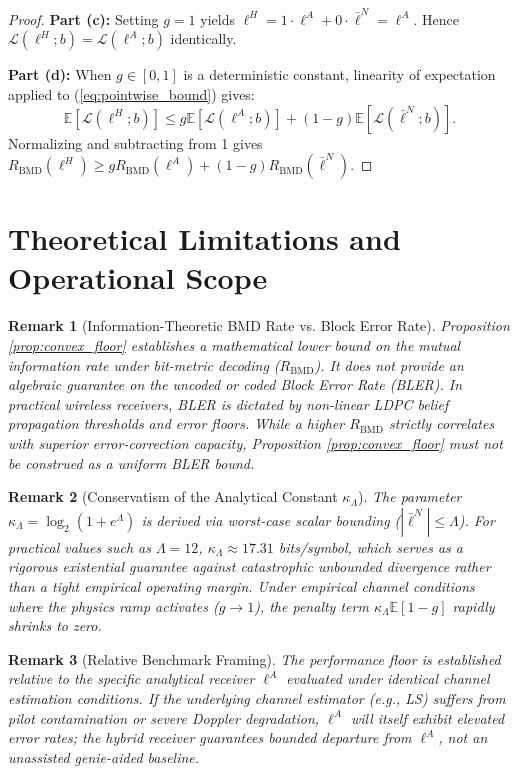 \documentclass[journal,onecolumn]{IEEEtran}
\newtheorem{remark}{Remark}
\begin{document}
\begin{proof}
\textbf{Part (c):} Setting $g = 1$ yields $\ell^H = 1 \cdot \ell^A + 0 \cdot \bar{\ell}^N = \ell^A$. Hence $\mathcal{L}(\ell^H; b) = \mathcal{L}(\ell^A; b)$ identically.

\textbf{Part (d):} When $g \in [0, 1]$ is a deterministic constant, linearity of expectation applied to (\ref{eq:pointwise_bound}) gives:
\begin{equation}
\mathbb{E}[\mathcal{L}(\ell^H; b)] \le g \mathbb{E}[\mathcal{L}(\ell^A; b)] + (1 - g) \mathbb{E}[\mathcal{L}(\bar{\ell}^N; b)].
\end{equation}
Normalizing and subtracting from 1 gives $R_{\text{BMD}}(\bm{\ell}^H) \ge g R_{\text{BMD}}(\bm{\ell}^A) + (1 - g) R_{\text{BMD}}(\bar{\bm{\ell}}^N)$.
\end{proof}

\section{Theoretical Limitations and Operational Scope}

\begin{remark}[Information-Theoretic BMD Rate vs. Block Error Rate]
Proposition \ref{prop:convex_floor} establishes a mathematical lower bound on the mutual information rate under bit-metric decoding ($R_{\text{BMD}}$). It does not provide an algebraic guarantee on the uncoded or coded Block Error Rate (BLER). In practical wireless receivers, BLER is dictated by non-linear LDPC belief propagation thresholds and error floors. While a higher $R_{\text{BMD}}$ strictly correlates with superior error-correction capacity, Proposition \ref{prop:convex_floor} must not be construed as a uniform BLER bound.
\end{remark}

\begin{remark}[Conservatism of the Analytical Constant $\kappa_\Lambda$]
The parameter $\kappa_\Lambda = \log_2(1 + e^\Lambda)$ is derived via worst-case scalar bounding ($|\bar{\ell}^N| \le \Lambda$). For practical values such as $\Lambda = 12$, $\kappa_\Lambda \approx 17.31$ bits/symbol, which serves as a rigorous existential guarantee against catastrophic unbounded divergence rather than a tight empirical operating margin. Under empirical channel conditions where the physics ramp activates ($g \to 1$), the penalty term $\kappa_\Lambda \mathbb{E}[1 - g]$ rapidly shrinks to zero.
\end{remark}

\begin{remark}[Relative Benchmark Framing]
The performance floor is established relative to the specific analytical receiver $\bm{\ell}^A$ evaluated under identical channel estimation conditions. If the underlying channel estimator (e.g., LS) suffers from pilot contamination or severe Doppler degradation, $\bm{\ell}^A$ will itself exhibit elevated error rates; the hybrid receiver guarantees bounded departure from $\bm{\ell}^A$, not an unassisted genie-aided baseline.
\end{remark}
\end{document}
